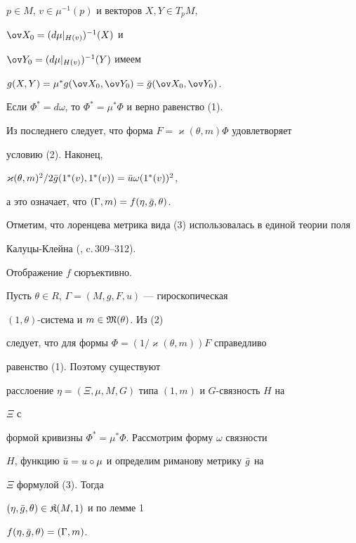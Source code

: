 \begin{pf}
$p\in M$, $v\in \mu^{-1}(p)$ и векторов $X,Y\in T_pM$, 


$\ov X_0=(d\mu|_{H(v)})^{-1}(X)$ и 


$\ov Y_0=(d\mu|_{H(v)})^{-1}(Y)$ имеем 


$g(X,Y)=\mu^*g(\ov X_0,\ov Y_0)=\Bar g(\ov X_0,\ov Y_0)$. 


Если $\Phi^*=d\omega$, то $\Phi^*=\mu^*\Phi$ и верно равенство (1). 


Из последнего следует, что форма $F=\varkappa(\theta,m)\Phi$ удовлетворяет 


условию (2). Наконец, 


$\varkappa(\theta,m)^2/2\Bar g(1^*(v),1^*(v))=\Bar u\omega(1^*(v))^2$, 


а это означает, что $(\Gamma,m)=f(\eta,\Bar g,\theta)$. 


\end{pf} 


 


Отметим, что лоренцева метрика вида (3) использовалась в единой теории поля 


Калуцы-Клейна (\cite{Pau}, c.\,309--312). 


 


\begin{lem} Отображение $f$ сюръективно. 


\end{lem} 


 


\begin{pf} Пусть $\theta\in R$, $\Gamma=(M,g,F,u)$ --- гироскопическая 


$(1,\theta)$-система и $m\in\frak M(\theta)$. Из (2) 


следует, что для формы $\Phi=(1/\varkappa(\theta,m))F$ справедливо 


равенство (1). Поэтому существуют 


расслоение $\eta=(\Xi,\mu,M,G)$ типа $(1,m)$ и $G$-связность $H$ на 


$\Xi$ с 


формой кривизны $\Phi^*=\mu^*\Phi$. Рассмотрим форму $\omega$ связности 


$H$, функцию $\Bar u=u\circ\mu$ и определим риманову метрику $\Bar g$ на 


$\Xi$ формулой (3). Тогда 


$(\eta,\Bar g,\theta)\in\frak K(M,1)$ и по лемме 1 


$f(\eta,\Bar g,\theta)=(\Gamma,m)$. 


\end{pf} 


